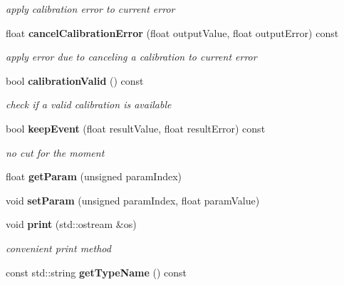 \begin{DoxyCompactItemize}
\begin{DoxyCompactList}\small\item\em apply calibration error to current error \item\end{DoxyCompactList}\item 
float {\bf cancelCalibrationError} (float outputValue, float outputError) const \label{classCALICE_1_1MIPConstants_acf2c408c31f28ed72e2513361ec545c6}

\begin{DoxyCompactList}\small\item\em apply error due to canceling a calibration to current error \item\end{DoxyCompactList}\item 
bool {\bf calibrationValid} () const \label{classCALICE_1_1MIPConstants_aba936e2505ba100025495dded661ccb0}

\begin{DoxyCompactList}\small\item\em check if a valid calibration is available \item\end{DoxyCompactList}\item 
bool {\bf keepEvent} (float resultValue, float resultError) const \label{classCALICE_1_1MIPConstants_a11232a43c70405ef3f8c4cc88641de6a}

\begin{DoxyCompactList}\small\item\em no cut for the moment \item\end{DoxyCompactList}\item 
float {\bfseries getParam} (unsigned paramIndex)\label{classCALICE_1_1MIPConstants_a08aee0fbd46dc239bbdba46da0d7c8e5}

\item 
void {\bfseries setParam} (unsigned paramIndex, float paramValue)\label{classCALICE_1_1MIPConstants_a0a107c4475947a8870b1c3735a52531d}

\item 
void {\bf print} (std::ostream \&os)\label{classCALICE_1_1MIPConstants_a11a113f9b833cdc4d5e1055459b9e384}

\begin{DoxyCompactList}\small\item\em convenient print method \item\end{DoxyCompactList}\item 
const std::string {\bf getTypeName} () const \label{classCALICE_1_1MIPConstants_a353fcaec4088c1dcb1e6e76f746654cc}


\end{DoxyCompactItemize}
